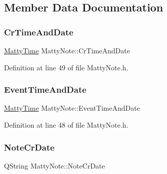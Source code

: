 \subsection{Member Data Documentation}
\hypertarget{classMattyNote_ae2959e86661be06281c70a5b87390587}{}\label{classMattyNote_ae2959e86661be06281c70a5b87390587} 
\subsubsection{\texorpdfstring{Cr\+Time\+And\+Date}{CrTimeAndDate}}
{\footnotesize\ttfamily \hyperlink{classMattyTime}{Matty\+Time} Matty\+Note\+::\+Cr\+Time\+And\+Date\hspace{0.3cm}{\ttfamily [private]}}



Definition at line 49 of file Matty\+Note.\+h.

\hypertarget{classMattyNote_a1f870bad84b62162b8ee07bff70e3003}{}\label{classMattyNote_a1f870bad84b62162b8ee07bff70e3003} 
\subsubsection{\texorpdfstring{Event\+Time\+And\+Date}{EventTimeAndDate}}
{\footnotesize\ttfamily \hyperlink{classMattyTime}{Matty\+Time} Matty\+Note\+::\+Event\+Time\+And\+Date\hspace{0.3cm}{\ttfamily [private]}}



Definition at line 48 of file Matty\+Note.\+h.

\hypertarget{classMattyNote_a3b94a4b062d2c2335f410f252210ed20}{}\label{classMattyNote_a3b94a4b062d2c2335f410f252210ed20} 
\subsubsection{\texorpdfstring{Note\+Cr\+Date}{NoteCrDate}}
{\footnotesize\ttfamily Q\+String Matty\+Note\+::\+Note\+Cr\+Date\hspace{0.3cm}{\ttfamily [private]}}



